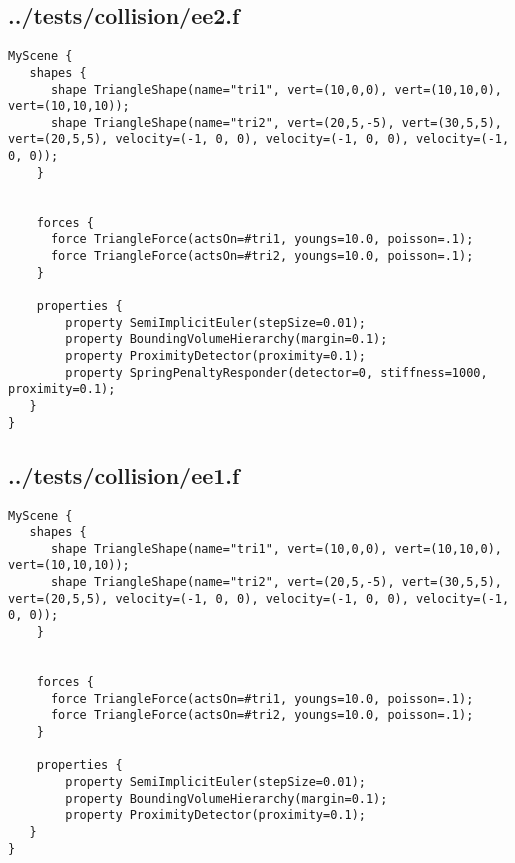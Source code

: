 \subsection*{../tests/collision/ee2.f}
\begin{lstlisting}
MyScene {
   shapes {
      shape TriangleShape(name="tri1", vert=(10,0,0), vert=(10,10,0), vert=(10,10,10));
      shape TriangleShape(name="tri2", vert=(20,5,-5), vert=(30,5,5), vert=(20,5,5), velocity=(-1, 0, 0), velocity=(-1, 0, 0), velocity=(-1, 0, 0));
    }

    
    forces {
      force TriangleForce(actsOn=#tri1, youngs=10.0, poisson=.1);
      force TriangleForce(actsOn=#tri2, youngs=10.0, poisson=.1);
    }

    properties { 
        property SemiImplicitEuler(stepSize=0.01);
        property BoundingVolumeHierarchy(margin=0.1);
        property ProximityDetector(proximity=0.1);
        property SpringPenaltyResponder(detector=0, stiffness=1000, proximity=0.1);
   }
}
\end{lstlisting}

\subsection*{../tests/collision/ee1.f}
\begin{lstlisting}
MyScene {
   shapes {
      shape TriangleShape(name="tri1", vert=(10,0,0), vert=(10,10,0), vert=(10,10,10));
      shape TriangleShape(name="tri2", vert=(20,5,-5), vert=(30,5,5), vert=(20,5,5), velocity=(-1, 0, 0), velocity=(-1, 0, 0), velocity=(-1, 0, 0));
    }

    
    forces {
      force TriangleForce(actsOn=#tri1, youngs=10.0, poisson=.1);
      force TriangleForce(actsOn=#tri2, youngs=10.0, poisson=.1);
    }

    properties { 
        property SemiImplicitEuler(stepSize=0.01);
        property BoundingVolumeHierarchy(margin=0.1);
        property ProximityDetector(proximity=0.1);
   }
}
\end{lstlisting}

